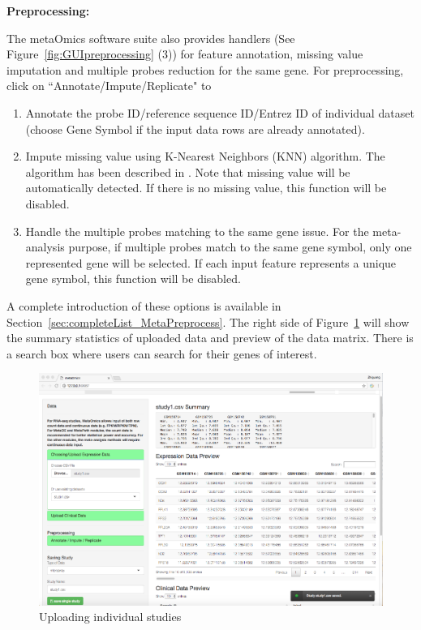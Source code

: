 \begin{steps}
\item \textbf{Preprocessing:}

The metaOmics software suite also provides handlers (See Figure~\ref{fig:GUIpreprocessing} {\color{red} (3)}) for feature annotation, 
missing value imputation and multiple probes reduction for the same gene.
For preprocessing, 
click on ``Annotate/Impute/Replicate" to 
\begin{enumerate}
\item Annotate the probe ID/reference sequence ID/Entrez ID of individual dataset (choose Gene Symbol if the input data rows are already annotated).
\item Impute missing value using K-Nearest Neighbors (KNN) algorithm.
The algorithm has been described in \cite{troyanskaya2001missing}.
Note that missing value will be automatically detected. 
If there is no missing value, this function will be disabled.

\item Handle the multiple probes matching to the same gene issue.
For the meta-analysis purpose, 
if multiple probes match to the same gene symbol, only one represented gene will be selected.
If each input feature represents a unique gene symbol, this function will be disabled.

\end{enumerate}

A complete introduction of these options is available in Section~\ref{sec:completeList_MetaPreprocess}.
The right side of Figure~\ref{fig:GUIpreview} will show the summary statistics of uploaded data and preview of the data matrix.
There is a search box where users can search for their genes of interest.

\begin{figure}[H]
\begin{center}
\includegraphics[scale=1]{./figure/preprocessing/GUIpreview}
\caption{Uploading individual studies}
\label{fig:GUIpreview}
\end{center}
\end{figure}


\end{steps}
